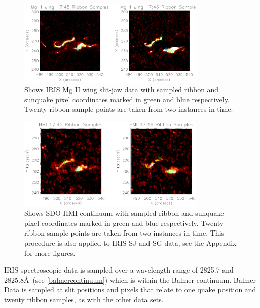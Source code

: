 \begin{figure}[H]
  \begin{center}
  \includegraphics[width=0.8\textwidth]{29-Mar-14-MGW-Ribbon-Coord-oplot}
  \end{center}
  \caption{Shows IRIS Mg II wing slit-jaw data with sampled ribbon and sunquake pixel coordinates marked in green and blue respectively. Twenty ribbon sample points are taken from two instances in time.}\label{mgwrib}
\end{figure}

\begin{figure}[H]
  \begin{center}
  \includegraphics[width=0.8\textwidth]{29-Mar-14-HMI-Ribbon-Coord-oplot}
  \end{center}
  \caption{Shows SDO HMI continuum with sampled ribbon and sunquake pixel coordinates marked in green and blue respectively. Twenty ribbon sample points are taken from two instances in time. This procedure is also applied to IRIS SJ and SG data, see the Appendix for more figures.}\label{hmirib}
\end{figure}


IRIS spectroscopic data is sampled over a wavelength range of 2825.7 and 2825.8\AA\ (see \ref{balmercontinuum}) which is within the Balmer continuum. Balmer Data is sampled at slit positions and pixels that relate to one quake position and twenty ribbon samples, as with the other data sets. 

